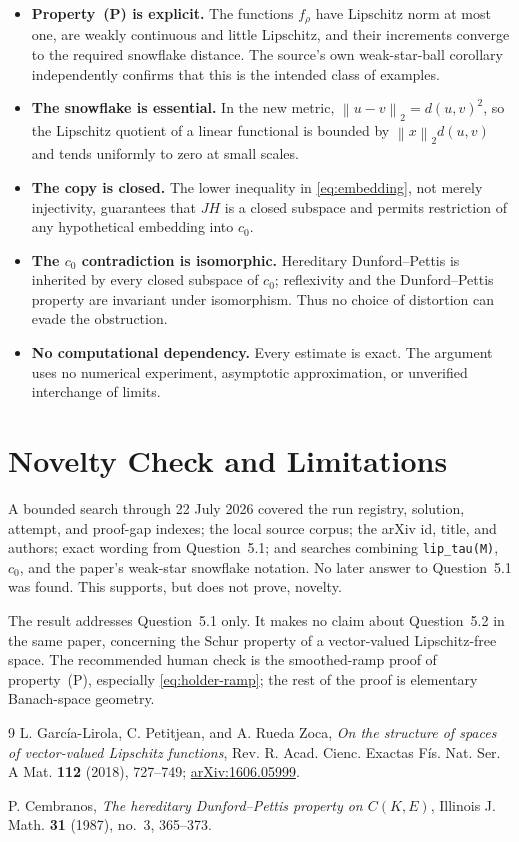 \documentclass[11pt]{article}
\newcommand{\norm}[1]{\left\lVert #1\right\rVert}
\begin{document}
\begin{itemize}
\item \textbf{Property~(P) is explicit.} The functions $f_\rho$ have
Lipschitz norm at most one, are weakly continuous and little Lipschitz, and
their increments converge to the required snowflake distance. The source's
own weak-star-ball corollary independently confirms that this is the intended
class of examples.
\item \textbf{The snowflake is essential.} In the new metric,
$\norm{u-v}_2=d(u,v)^2$, so the Lipschitz quotient of a linear functional is
bounded by $\norm{x}_2d(u,v)$ and tends uniformly to zero at small scales.
\item \textbf{The copy is closed.} The lower inequality in
\eqref{eq:embedding}, not merely injectivity, guarantees that $JH$ is a closed
subspace and permits restriction of any hypothetical embedding into $c_0$.
\item \textbf{The $c_0$ contradiction is isomorphic.} Hereditary
Dunford--Pettis is inherited by every closed subspace of $c_0$; reflexivity
and the Dunford--Pettis property are invariant under isomorphism. Thus no
choice of distortion can evade the obstruction.
\item \textbf{No computational dependency.} Every estimate is exact. The
argument uses no numerical experiment, asymptotic approximation, or
unverified interchange of limits.
\end{itemize}

\section*{Novelty Check and Limitations}

A bounded search through 22 July 2026 covered the run registry, solution,
attempt, and proof-gap indexes; the local source corpus; the arXiv id, title,
and authors; exact wording from Question~5.1; and searches combining
\texttt{lip\_tau(M)}, $c_0$, and the paper's weak-star snowflake notation.
No later answer to Question~5.1 was found. This supports, but does not prove,
novelty.

The result addresses Question~5.1 only. It makes no claim about Question~5.2
in the same paper, concerning the Schur property of a vector-valued
Lipschitz-free space. The recommended human check is the smoothed-ramp proof
of property~(P), especially \eqref{eq:holder-ramp}; the rest of the proof is
elementary Banach-space geometry.

\begin{thebibliography}{9}
L. García-Lirola, C. Petitjean, and A. Rueda Zoca,
\emph{On the structure of spaces of vector-valued Lipschitz functions},
Rev. R. Acad. Cienc. Exactas Fís. Nat. Ser. A Mat. \textbf{112} (2018),
727--749; \href{https://arxiv.org/abs/1606.05999}{arXiv:1606.05999}.

P. Cembranos,
\emph{The hereditary Dunford--Pettis property on $C(K,E)$},
Illinois J. Math. \textbf{31} (1987), no.~3, 365--373.
\end{thebibliography}
\end{document}
